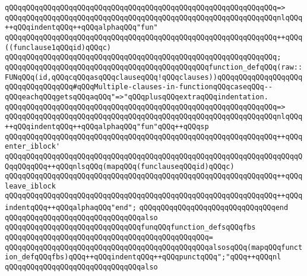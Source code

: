 \verb|qQQqqQQqqQQqqQQqqQQqqQQqqQQqqQQqqQQqqQQqqQQqqQQqqQQqqQQqqQQqqQQq=>|\newline
\verb|qQQqqQQqqQQqqQQqqQQqqQQqqQQqqQQqqQQqqQQqqQQqqQQqqQQqqQQqqQQqqQQqnlqQQq++qQQqindentqQQq++qQQqalphaqQQq"fun"|\newline
\verb|qQQqqQQqqQQqqQQqqQQqqQQqqQQqqQQqqQQqqQQqqQQqqQQqqQQqqQQqqQQqqQQq++qQQq((funclause1qQQqid)qQQqc)|\newline
\verb|qQQqqQQqqQQqqQQqqQQqqQQqqQQqqQQqqQQqqQQqqQQqqQQqqQQqqQQqqQQqqQQq;|\newline
\newline
\verb|qQQqqQQqqQQqqQQqqQQqqQQqqQQqqQQqqQQqqQQqqQQqqQQqfunction_defqQQq(raw::FUNqQQq(id,qQQqcqQQqasqQQqclauseqQQq!qQQqclauses))qQQqqQQqqQQqqQQqqQQqqQQqqQQqqQQqqQQq#qQQqMultiple-clauses-in-functionqQQqcaseqQQq--qQQqeachqQQqgetsqQQqaqQQq"=>"qQQqplusqQQqextraqQQqindentation.|\newline
\verb|qQQqqQQqqQQqqQQqqQQqqQQqqQQqqQQqqQQqqQQqqQQqqQQqqQQqqQQqqQQqqQQq=>|\newline
\verb|qQQqqQQqqQQqqQQqqQQqqQQqqQQqqQQqqQQqqQQqqQQqqQQqqQQqqQQqqQQqqQQqnlqQQq++qQQqindentqQQq++qQQqalphaqQQq"fun"qQQq++qQQqsp|\newline
\verb|qQQqqQQqqQQqqQQqqQQqqQQqqQQqqQQqqQQqqQQqqQQqqQQqqQQqqQQqqQQqqQQq++qQQqenter_iblock'|\newline
\verb|qQQqqQQqqQQqqQQqqQQqqQQqqQQqqQQqqQQqqQQqqQQqqQQqqQQqqQQqqQQqqQQqqQQqqQQqqQQqqQQq++qQQqnlsqQQq(mapqQQq(funclauseqQQqid)qQQqc)|\newline
\verb|qQQqqQQqqQQqqQQqqQQqqQQqqQQqqQQqqQQqqQQqqQQqqQQqqQQqqQQqqQQqqQQq++qQQqleave_iblock|\newline
\verb|qQQqqQQqqQQqqQQqqQQqqQQqqQQqqQQqqQQqqQQqqQQqqQQqqQQqqQQqqQQqqQQq++qQQqindentqQQq++qQQqalphaqQQq"end";|\newline
\verb|qQQqqQQqqQQqqQQqqQQqqQQqqQQqqQQqend|\newline
\newline
\verb|qQQqqQQqqQQqqQQqqQQqqQQqqQQqqQQqalso|\newline
\verb|qQQqqQQqqQQqqQQqqQQqqQQqqQQqqQQqfunqQQqfunction_defsqQQqfbs|\newline
\verb|qQQqqQQqqQQqqQQqqQQqqQQqqQQqqQQqqQQqqQQqqQQqqQQq=|\newline
\verb|qQQqqQQqqQQqqQQqqQQqqQQqqQQqqQQqqQQqqQQqqQQqqQQqalsosqQQq(mapqQQqfunction_defqQQqfbs)qQQq++qQQqindentqQQq++qQQqpunctqQQq";"qQQq++qQQqnl|\newline
\newline
\verb|qQQqqQQqqQQqqQQqqQQqqQQqqQQqqQQqalso|\newline
